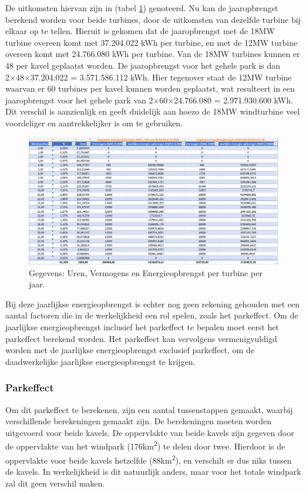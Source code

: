 De uitkomsten hiervan zijn in (tabel \ref{fig:Jaaropbrengst}) genoteerd. Nu kan de jaaropbrengst berekend worden voor beide turbines, door de uitkomsten van dezelfde turbine bij elkaar op te tellen. Hieruit is gekomen dat de jaaropbrengst met de 18MW turbine overeen komt met 37.204.022 kWh per turbine, en met de 12MW turbine overeen komt met 24.766.080 kWh per turbine. Van de 18MW turbines kunnen er 48 per kavel geplaatst worden. De jaaropbrengst voor het gehele park is dan 2×48×37.204.022 = 3.571.586.112 kWh. Hier tegenover staat de 12MW turbine waarvan er 60 turbines per kavel kunnen worden geplaatst, wat resulteert in een jaaropbrengst voor het gehele park van 2×60×24.766.080 = 2.971.930.600 kWh. Dit verschil is aanzienlijk en geeft duidelijk aan hoezo de 18MW windturbine veel voordeliger en aantrekkelijker is om te gebruiken.
\begin{figure}[H]
\centering
\includegraphics[width=1\textwidth]{IMG/data/overzicht/uren,vermogens,energieopbrengst.PNG}
\caption{Gegevens: Uren, Vermogens en Energieopbrengst per turbine per jaar.}
\label{fig:Jaaropbrengst}
\end{figure}
Bij deze jaarlijkse energieopbrengst is echter nog geen rekening gehouden met een aantal factoren die in de werkelijkheid een rol spelen, zoals het parkeffect. Om de jaarlijkse energieopbrengst inclusief het parkeffect te bepalen moet eerst het parkeffect berekend worden. Het parkeffect kan vervolgens vermenigvuldigd worden met de jaarlijkse energieopbrengst exclusief parkeffect, om de daadwerkelijke jaarlijkse energieopbrengst te krijgen. 

\subsubsection{Parkeffect}
Om dit parkeffect te berekenen, zijn een aantal tussenstappen gemaakt, waarbij verschillende berekeningen gemaakt zijn. De berekeningen moeten worden uitgevoerd voor beide kavels. De oppervlakte van beide kavels zijn gegeven door de oppervlakte van het windpark (176km\textsuperscript{2}) te delen door twee. Hierdoor is de oppervlakte voor beide kavels hetzelfde (88km\textsuperscript{2}), en verschilt er dus niks tussen de kavels. In werkelijkheid is dit natuurlijk anders, maar voor het totale windpark zal dit geen verschil maken. 

